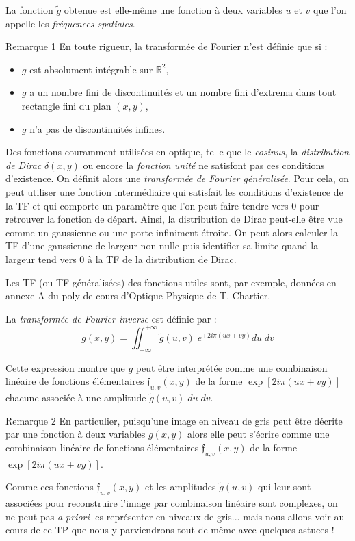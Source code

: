 \documentclass[a4paper,twoside,10pt]{book}
\newcommand{\TF}[1]{\tilde{#1}}
\renewcommand{\u}{u}
\renewcommand{\v}{v}
\newcommand{\f}[1]{\mathfrak{f}_{#1}}
\begin{document}
La fonction $\TF{g}$ obtenue est elle-même une fonction à deux variables $\u$ et $\v$ que l'on appelle les \emph{fréquences spatiales}.

\begin{bclogo}[logo=\bcinfo, noborder=true]{Remarque 1}
En toute rigueur, la transformée de Fourier n'est définie que si :
\begin{itemize}
\item $g$ est absolument intégrable sur $\mathbb{R}^2$,
\item $g$ a un nombre fini de discontinuités et un nombre fini d'extrema dans tout rectangle fini du plan $(x,y)$,
\item $g$ n'a pas de discontinuités infines.
\end{itemize}

Des fonctions couramment utilisées en optique, telle que le \emph{cosinus}, la \emph{distribution de Dirac} $\delta(x,y)$ ou encore la \emph{fonction unité} ne satisfont pas ces conditions d'existence. On définit alors une \emph{transformée de Fourier généralisée}. Pour cela, on peut utiliser une fonction intermédiaire qui satisfait les conditions d'existence de la TF et qui comporte un paramètre que l'on peut faire tendre vers 0 pour retrouver la fonction de départ. Ainsi, la distribution de Dirac peut-elle être vue comme un gaussienne ou une porte infiniment étroite. On peut alors calculer la TF d'une gaussienne de largeur non nulle puis identifier sa limite quand la largeur tend vers 0 à la TF de la distribution de Dirac.

Les TF (ou TF généralisées) des fonctions utiles sont, par exemple, données en annexe A du poly de cours d'Optique Physique de T. Chartier.
\end{bclogo}

La \emph{transformée de Fourier inverse} est définie par :
\begin{equation}\label{eq:TFinverse}
g(x,y) = \iint_{-\infty}^{+\infty} \TF{g}(\u,\v) \; e^{+2i\pi(\u x + \v y)} d\u \; d\v
\end{equation}

Cette expression montre que $g$ peut être interprétée comme une combinaison linéaire de fonctions élémentaires $\f{u,v}(x, y)$ de la forme $\exp[2i\pi(\u x + \v y)]$ chacune associée à une amplitude $\TF{g}(\u,\v)\; d\u \; d\v$.

\begin{bclogo}[logo=\bcinfo, noborder=true]{Remarque 2}
En particulier, puisqu'une image en niveau de gris peut être décrite par une fonction à deux variables $g(x, y)$ alors elle peut s'écrire comme une combinaison linéaire de fonctions élémentaires $\f{\u,\v}(x, y)$ de la forme $\exp[2i\pi(\u x + \v y)]$.

Comme ces fonctions $\f{\u, \v}(x, y)$ et les amplitudes $\TF{g}(\u,\v)$ qui leur sont associées pour reconstruire l'image par combinaison linéaire sont complexes, on ne peut pas \textit{a priori} les représenter en niveaux de gris... mais nous allons voir au cours de ce TP que nous y parviendrons tout de même avec quelques astuces !
\end{bclogo}
\end{document}
